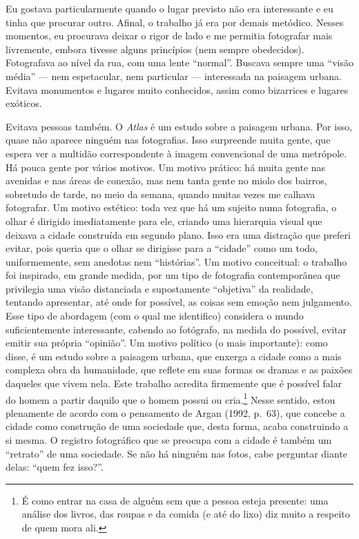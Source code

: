 Eu gostava particularmente quando o lugar previsto não era interessante
e eu tinha que procurar outro. Afinal, o trabalho já era por demais
metódico. Nesses momentos, eu procurava deixar o rigor de lado e me
permitia fotografar mais livremente, embora tivesse alguns princípios
(nem sempre obedecidos). Fotografava ao nível da rua, com uma lente
``normal''. Buscava sempre uma ``visão média'' --- nem espetacular, nem
particular --- interessada na paisagem urbana. Evitava monumentos e lugares
muito conhecidos, assim como bizarrices e lugares exóticos.

Evitava pessoas também. O \emph{Atlas} é um estudo sobre a paisagem
urbana. Por isso, quase não aparece ninguém nas fotografias. Isso
surpreende muita gente, que espera ver a multidão correspondente à
imagem convencional de uma metrópole. Há pouca gente por vários motivos.
Um motivo prático: há muita gente nas avenidas e nas áreas de conexão,
mas nem tanta gente no miolo dos bairros, sobretudo de tarde, no meio da
semana, quando muitas vezes me calhava fotografar. Um motivo estético:
toda vez que há um sujeito numa fotografia, o olhar é dirigido
imediatamente para ele, criando uma hierarquia visual que deixava a
cidade construída em segundo plano. Isso era uma distração que preferi
evitar, pois queria que o olhar se dirigisse para a ``cidade'' como um
todo, uniformemente, sem anedotas nem ``histórias''. Um motivo
conceitual: o trabalho foi inspirado, em grande medida, por um tipo de
fotografia contemporânea que privilegia uma visão distanciada e
supostamente ``objetiva'' da realidade, tentando apresentar, até onde
for possível, as coisas sem emoção nem julgamento. Esse tipo de
abordagem (com o qual me identifico) considera o mundo suficientemente
interessante, cabendo ao fotógrafo, na medida do possível, evitar emitir
sua própria ``opinião''. Um motivo político (o mais importante): como
disse, é um estudo sobre a paisagem urbana, que enxerga a cidade como a
mais complexa obra da humanidade, que reflete em suas formas os dramas e
as paixões daqueles que vivem nela. Este trabalho acredita firmemente
que é possível falar do homem a partir daquilo que o homem possui ou
cria.\footnote{É como entrar na casa de alguém sem que a pessoa esteja
  presente: uma análise dos livros, das roupas e da comida (e até do
  lixo) diz muito a respeito de quem mora ali.} Nesse sentido, estou
plenamente de acordo com o pensamento de Argan (1992, p.~63), que
concebe a cidade como construção de uma sociedade que, desta forma,
acaba construindo a si mesma. O registro fotográfico que se preocupa com
a cidade é também um ``retrato'' de uma sociedade. Se não há ninguém nas
fotos, cabe perguntar diante delas: ``quem fez isso?''.

